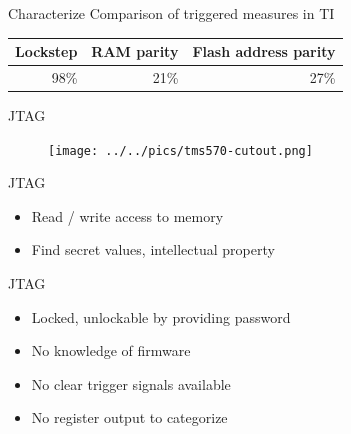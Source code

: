 \documentclass[table]{beamer}
\begin{document}
\begin{frame}{Characterize}{ Comparison of triggered measures in TI}
    

    \begin{table}[H]
          \centering
          \begin{tabular}{ r r r}
          \toprule
             Lockstep & RAM parity & Flash address parity \\
            \midrule
             98\% & 21\% & 27\% \\
          \bottomrule
          \end{tabular}
    \end{table}

\end{frame}

\begin{frame}{JTAG}
    \begin{figure}[H]
      \centering
      \texttt{[image: ../../pics/tms570-cutout.png]}
    \end{figure}
\end{frame}

\begin{frame}{JTAG}
    \begin{itemize}
        \item Read / write access to memory
        \item Find secret values, intellectual property
    \end{itemize}
        
\end{frame}
    
\begin{frame}{JTAG}
    \begin{itemize}
        \item Locked, unlockable by providing password
        \item No knowledge of firmware
        \item No clear trigger signals available
        \item No register output to categorize
    \end{itemize}
\end{frame}
\end{document}
